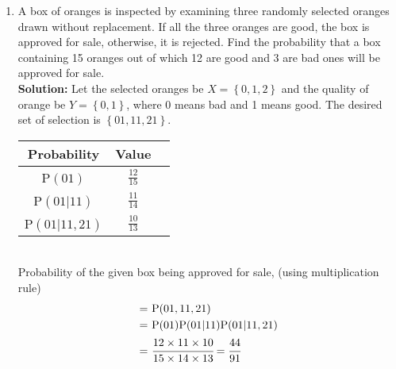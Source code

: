 \documentclass[journal,12pt,twocolumn]{IEEEtran}
\providecommand{\cbrak}[1]{\ensuremath{\left\{#1\right\}}}
\newcommand{\solution}{\noindent \textbf{Solution: }}
\newcommand\T{\rule{0pt}{2.6ex}}       %
\newcommand\B{\rule[-1.2ex]{0pt}{0pt}} %
\begin{document}
\begin{enumerate}[label=13.\arabic{enumi}.\arabic{enumii}]

\setcounter{enumi}{1}
\setcounter{enumii}{3}
\item A box of oranges is inspected by examining three randomly selected oranges drawn without replacement. If all the three oranges are good, the box is approved for sale, otherwise, it is rejected. Find the probability that a box containing 15 oranges out of which 12 are good and 3 are bad ones will be approved for sale.\\
	\solution
		Let the selected oranges be $X = \cbrak{0,1,2}$ and the quality of orange be $Y = \cbrak{0,1}$, where 0 means bad and 1 means good. The desired set of selection is \cbrak{01,11,21}.
	\begin{table}[h!]
	\small
	\centering
		\begin{tabular}[20pt]{|c|c|c|} \hline
			\textbf{Probability}&\textbf{Value}\\ \hline
			P$(01)$ \B \T &$\frac{12}{15}$  \\ \hline
			P$(01|11)$ \B \T &$\frac{11}{14}$  \\ \hline
			P$(01|11,21)$ \T \B &$\frac{10}{13}$  \\ \hline
		\end{tabular}
	\end{table}
		\\ Probability of the given box being approved for sale, (using multiplication rule)
	\begin{align}
		=& \text{ }\text{P}(01,11,21) \\
		=& \text{ }\text{P}(01)\text{P}(01|11)\text{P}(01|11,21) \\
		=& \text{ }\cfrac{12 \times 11 \times 10}{15 \times 14 \times 13} = \cfrac{44}{91}
	\end{align}


\end{enumerate}
\end{document}
